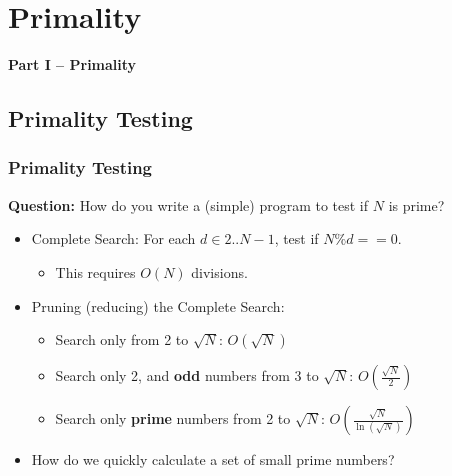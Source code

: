 
\section{Primality}
\begin{frame}
  \begin{center}
  {\bf Part I -- Primality}
  \end{center}
\end{frame}


\subsection{Primality Testing}
\begin{frame}
  \frametitle{Primality Testing}

    {\bf Question:} How do you write a (simple) program to test if $N$ is prime?\bigskip

    \begin{itemize}

      \item Complete Search: For each $d \in 2..N-1$, test if $N\%d == 0$.
      \begin{itemize}
        \item This requires $O(N)$ divisions.\medskip
      \end{itemize}

      \item Pruning (reducing) the Complete Search:
      \begin{itemize}
        \item Search only from 2 to $\sqrt{N}$: $O(\sqrt{N})$
        \item Search only 2, and {\bf odd} numbers from 3 to $\sqrt{N}$: $O(\frac{\sqrt{N}}{2})$
        \item Search only {\bf prime} numbers from 2 to $\sqrt{N}$:
        $O(\frac{\sqrt{N}}{\ln(\sqrt{N})})$
      \end{itemize}\medskip

      \item How do we quickly calculate a set of small prime numbers?
    \end{itemize}
\end{frame}

